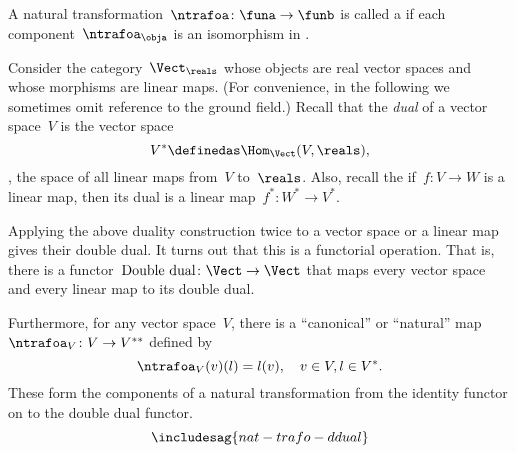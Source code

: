 \begin{figure}[h!]
  \begin{center}
  \end{center}
  \caption{}
  \label{fig:nat_trans_graphically}
\end{figure}

\begin{ctdefinition}
  \label{def:nat_iso}
  A natural transformation~$\ntrafoa \colon \funa \to \funb $ is called a \emph{} if each component~$\ntrafoa_\obja$ is an isomorphism in \CatD.
\end{ctdefinition}




\begin{example}\label{ex:Vect}
  Consider the category~$\Vect_{\reals}$ whose objects are real vector spaces and whose morphisms are linear maps. (For convenience, in the following we sometimes omit reference to the ground field.) Recall that the \emph{dual} of a vector space~$V$ is the vector space
  \begin{equation*}
    V^* \definedas \Hom_{\Vect}(V, \reals),
  \end{equation*}
  \ie , the space of all linear maps from~$V$ to~$\reals$. Also, recall the if~$f\colon V \to W$ is a linear map, then its dual is a linear map~$f^*\colon W^* \to V^*$.

  Applying the above duality construction twice to a vector space or a linear map gives their double dual. It turns out that this is a functorial operation. That is, there is a functor~$\text{Double dual}\colon \Vect \to \Vect$ that maps every vector space and every linear map to its double dual.

  Furthermore, for any vector space~$V$, there is a ``canonical'' or ``natural'' map~$\ntrafoa_V \colon V \to V^{**}$ defined by
  \begin{equation*}
    \ntrafoa_V(v)(l) = l(v), \quad  v \in V, l \in V^*.
  \end{equation*}
  These form the components of a natural transformation from the identity functor on \Vect to the double dual functor.
  \begin{equation}
    \includesag{nat-trafo-ddual}
  \end{equation}
\end{example}



